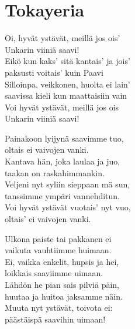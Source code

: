 \section{Tokayeria}
Oi, hyvät ystävät, meillä jos ois'\\
Unkarin viiniä saavi!\\
Eikö kun kaks' sitä kantais' ja jois'\\
paksusti voitais' kuin Paavi\\
Silloinpa, veikkonen, huolta ei lain'\\
saavissa kieli kun maattaisiin vain\\
Voi hyvät ystävät, meillä jos ois\\
Unkarin viiniä saavi!

Painakoon lyijynä saavimme tuo,\\
oltais ei vaivojen vanki.\\
Kantava hän, joka laulaa ja juo,\\
taakan on raskahimmankin.\\
Veljeni nyt syliin sieppaan mä sun,\\
tanssimme ympäri vannehditun.\\
Voi hyvät ystävät vuotais' nyt vuo,\\
oltais' ei vaivojen vanki.

Ulkona paiste tai pakkanen ei\\
vaikuta vauhtiimme huimaan.\\
Ei, vaikka enkelit, hupsis ja hei,\\
loikkais saaviimme uimaan.\\
Lähdön he pian sais pilviä päin,\\
huutaa ja huitoa jaksamme näin.\\
Muuta nyt ystävät, toivota ei:\\
päästäispä saavihin uimaan!
